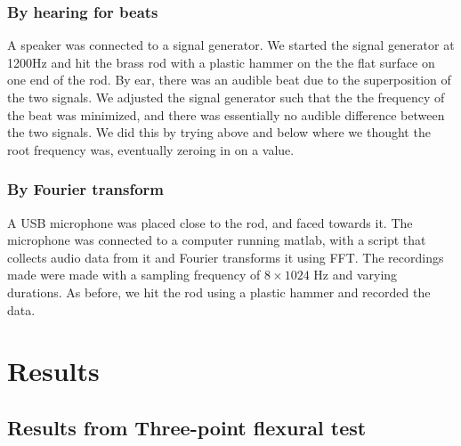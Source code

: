 \documentclass[%
 reprint,
 amsmath,amssymb,
 aps,
]{revtex4-1}
\begin{document}
      \subsubsection{By hearing for beats}
        A speaker was connected to a signal generator. We started the signal generator at 1200Hz and hit the brass rod with a plastic hammer on the the flat surface on one end of the rod. By ear, there was an audible beat due to the superposition of the two signals. We adjusted the signal generator such that the the frequency of the beat was minimized, and there was essentially no audible difference between the two signals. We did this by trying above and below where we thought the root frequency was, eventually zeroing in on a value.

      \subsubsection{By Fourier transform}
        A USB microphone was placed close to the rod, and faced towards it. The microphone was connected to a computer running matlab, with a script that collects audio data from it and Fourier transforms it using FFT. The recordings made were made with a sampling frequency of $8\times1024$ Hz and varying durations. As before, we hit the rod using a plastic hammer and recorded the data.



\section{\label{sect:results}Results}
  \subsection{Results from Three-point flexural test}
   
\end{document}
